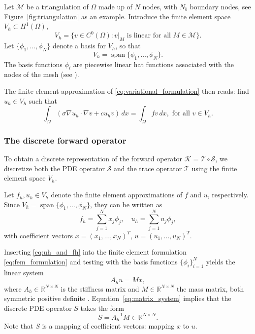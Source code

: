 Let $\mathcal M$ be a triangulation of $\Omega$ made up of $N$ nodes, with $N_b$ boundary nodes, see Figure~\ref{fig:triangulation} as an example. Introduce the finite element space $V_h \subset H^1(\Omega)$,
\begin{equation}\label{eq:fem_space}
    V_h = \{v \in C^0(\Omega) : v|_M \text{ is linear for all } M \in \mathcal M \}.
\end{equation}
Let $\{\phi_1, \dots, \phi_N\}$ denote a basis for $V_h$, so that
\begin{equation*}
    V_h = \operatorname{span}\{ \phi_1, \dots, \phi_N \}.
\end{equation*}
The basis functions $\phi_i$ are piecewise linear hat functions associated with the nodes of the mesh (see \cite[p.~51]{larsonFiniteElementMethod2013}).

The finite element approximation of \eqref{eq:variational_formulation} then reads: 
find $u_h \in V_h$ such that
 \begin{equation}\label{eq:fem_formulation}
    \int_{\Omega} (\sigma \nabla u_h \cdot \nabla v + c u_h v) \, dx = \int_{\Omega} f v \, dx,
    \text{ for all } v \in V_h.
\end{equation}


\subsubsection{The discrete forward operator}
To obtain a discrete representation of the forward operator 
$\mathcal{K} = \mathcal{T} \circ \mathcal{S}$, 
we discretize both the PDE operator $\mathcal{S}$ and the trace operator $\mathcal{T}$ using the finite element space $V_h$.

Let $f_h, u_h \in V_h$ denote the finite element approximations of $f$ and $u$, respectively. Since $V_h = \operatorname{span}\{\phi_1,\dots,\phi_N\}$, they can be written as
\begin{equation}\label{eq:uh_and_fh}
    f_h = \sum_{j=1}^{N} x_j \phi_j, \quad
    u_h = \sum_{j=1}^{N} u_j \phi_j, 
\end{equation}
with coefficient vectors $x = (x_1,\dots,x_N)^T$, $u = (u_1,\dots,u_N)^T$.

Inserting \eqref{eq:uh_and_fh} into the finite element formulation \eqref{eq:fem_formulation} and testing with the basis functions 
$\{\phi_i\}_{i=1}^N$ yields the linear system
\begin{equation}\label{eq:matrix_system}
    A_h u = M x,
\end{equation}
where $A_h \in \mathbb{R}^{N \times N}$ is the stiffness matrix and $M \in \mathbb{R}^{N \times N}$ the mass matrix, both symmetric positive definite \cite{larsonFiniteElementMethod2013}.
Equation~\eqref{eq:matrix_system} implies that the discrete PDE operator $S$ takes the form
\begin{equation*}
    S = A_h^{-1} M \in \mathbb{R}^{N \times N}.
\end{equation*}
Note that $S$ is a mapping of coefficient vectors: mapping $x$ to $u$.

